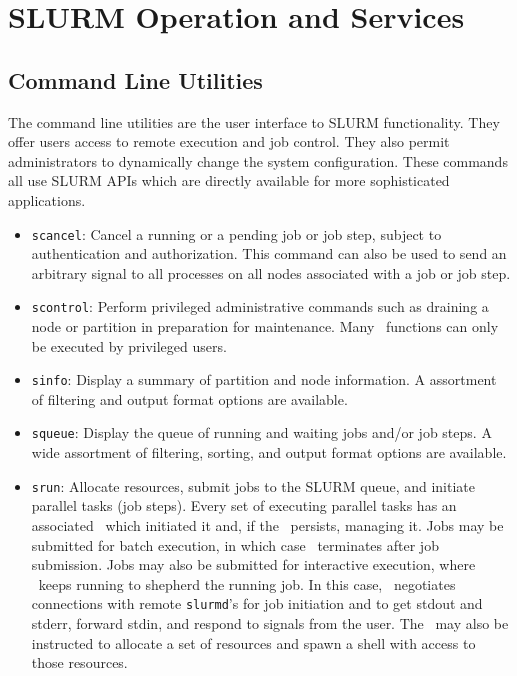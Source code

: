 \section{SLURM Operation and Services}
\subsection{Command Line Utilities}

The command line utilities are the user interface to SLURM functionality.
They offer users access to remote execution and job control. They also 
permit administrators to dynamically change the system configuration. 
These commands all use SLURM APIs which are directly available for 
more sophisticated applications.

\begin{itemize}
\item {\tt scancel}: Cancel a running or a pending job or job step, 
subject to authentication and authorization. This command can also 
be used to send an arbitrary signal to all processes on all nodes 
associated with a job or job step.

\item {\tt scontrol}: Perform privileged administrative commands
such as draining a node or partition in preparation for maintenance. 
Many \scontrol\ functions can only be executed by privileged users.

\item {\tt sinfo}: Display a summary of partition and node information.
A assortment of filtering and output format options are available.

\item {\tt squeue}: Display the queue of running and waiting jobs 
and/or job steps. A wide assortment of filtering, sorting, and output 
format options are available.

\item {\tt srun}: Allocate resources, submit jobs to the SLURM queue,
and initiate parallel tasks (job steps). 
Every set of executing parallel tasks has an associated \srun\ which 
initiated it and, if the \srun\ persists, managing it. 
Jobs may be submitted for batch execution, in which case 
\srun\ terminates after job submission. 
Jobs may also be submitted for interactive execution, where \srun\ keeps 
running to shepherd the running job. In this case, 
\srun\ negotiates connections with remote {\tt slurmd}'s 
for job initiation and to
get stdout and stderr, forward stdin, and respond to signals from the user.
The \srun\ may also be instructed to allocate a set of resources and
spawn a shell with access to those resources.

\end{itemize}

